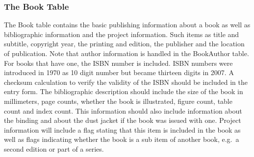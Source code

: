 \documentclass{article}
\begin{document}
\subsubsection{The Book Table}

The Book table contains the basic publishing information about a book
as well as bibliographic information and the project information. Such
items as title and subtitle, copyright year, the printing and edition,
the publisher and the location of publication. Note that author
information is handled in the BookAuthor table. For books that have
one, the ISBN number is included.  ISBN numbers were introduced in
1970 as 10 digit number but became thirteen digits in 2007.  A
checksum calculation to verify the validity of the ISBN should be
included in the entry form. The bibliographic description should
include the size of the book in millimeters, page counts, whether the
book is illustrated, figure count, table count and index count.  This
information should also include information about the binding and
about the dust jacket if the book was issued with one. Project
information will include a flag stating that this item is included in
the book as well as flags indicating whether the book is a sub item of
another book, e.g.\ a second edition or part of a series.
\end{document}

